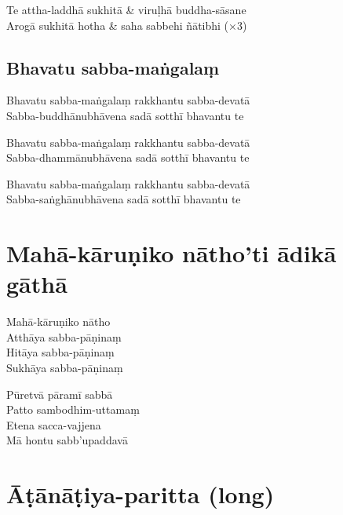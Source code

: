 \begin{paritta}

\begin{twochants}
Te attha-laddhā sukhitā & viruḷhā buddha-sāsane\\
Arogā sukhitā hotha & saha sabbehi ñātibhi (×3)\\
\end{twochants}


\subsection{Bhavatu sabba-maṅgalaṃ}
\label{bhavatu}


Bhavatu sabba-maṅgalaṃ rakkhantu sabba-devatā\\
Sabba-buddhānubhāvena sadā sotthī bhavantu te

Bhavatu sabba-maṅgalaṃ rakkhantu sabba-devatā\\
Sabba-dhammānubhāvena sadā sotthī bhavantu te

Bhavatu sabba-maṅgalaṃ rakkhantu sabba-devatā\\
Sabba-saṅghānubhāvena sadā sotthī bhavantu te

\section{Mahā-kāruṇiko nātho'ti ādikā gāthā}


\begin{paritta}
Mahā-kāruṇiko nātho\\
Atthāya sabba-pāṇinaṃ\\
Hitāya sabba-pāṇinaṃ\\
Sukhāya sabba-pāṇinaṃ

Pūretvā pāramī sabbā\\
Patto sambodhim-uttamaṃ\\
Etena sacca-vajjena\\
Mā hontu sabb'upaddavā
\end{paritta}

\clearpage

\section{Āṭānāṭiya-paritta (long)}

\begin{leader}


\end{leader}
\end{paritta}
